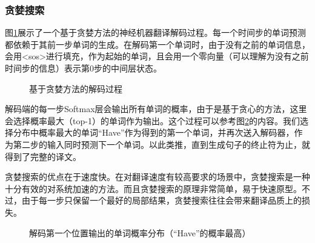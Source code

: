 \vspace{1.0em}
\subsubsection{贪婪搜索}
\vspace{0.6em}
\parinterval 图\ref{fig:6-32}展示了一个基于贪婪方法的神经机器翻译解码过程。每一个时间步的单词预测都依赖于其前一步单词的生成。在解码第一个单词时，由于没有之前的单词信息，会用<sos>进行填充，作为起始的单词，且会用一个零向量（可以理解为没有之前时间步的信息）表示第0步的中间层状态。
\vspace{0.8em}

\begin{figure}[htp]
\centering

\caption{基于贪婪方法的解码过程}
\label{fig:6-32}
\end{figure}

\vspace{0.2em}
\parinterval 解码端的每一步Softmax层会输出所有单词的概率，由于是基于贪心的方法，这里会选择概率最大（top-1）的单词作为输出。这个过程可以参考图\ref{fig:6-33}的内容。我们选择分布中概率最大的单词``Have''作为得到的第一个单词，并再次送入解码器，作为第二步的输入同时预测下一个单词。以此类推，直到生成句子的终止符为止，就得到了完整的译文。

\parinterval 贪婪搜索的优点在于速度快。在对翻译速度有较高要求的场景中，贪婪搜索是一种十分有效的对系统加速的方法。而且贪婪搜索的原理非常简单，易于快速原型。不过，由于每一步只保留一个最好的局部结果，贪婪搜索往往会带来翻译品质上的损失。

\begin{figure}[htp]
\centering

\caption{解码第一个位置输出的单词概率分布（``Have''的概率最高）}
\label{fig:6-33}
\end{figure}



